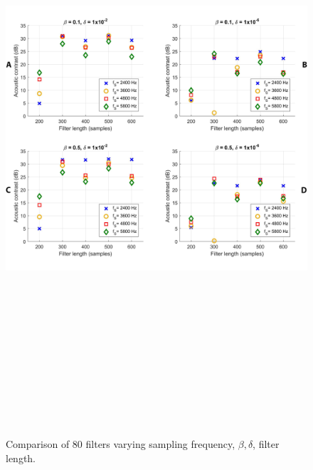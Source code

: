 \begin{figure}[H]
\centering
\includegraphics[width=15cm,height=22cm,keepaspectratio]{Figures/comparison_COMP}
\decoRule
\caption[Comprehensive comparison of the filters]{Comparison of 80 filters varying sampling frequency, $\beta, \delta$, filter length.}
\label{fig:comparison1}
\end{figure}

